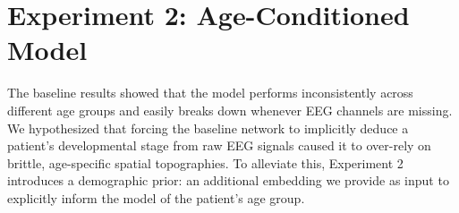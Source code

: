 \begin{table}[ht]
\centering
\caption{\textbf{Performance Breakdown by Age Cohort.} This table details the accuracy, and Cohen's Kappa scores across four distinct age groups for each channel setup. It illustrates the severe impact of simulated missing data on younger cohorts and the unexpectedly improved generalization for teenagers when we train the model on fewer channels.}
\label{tab:age_group_results}
\end{table}

\FloatBarrier
\section{Experiment 2: Age-Conditioned Model}
\label{sec:exp2_data}
The baseline results showed that the model performs inconsistently across different age groups and easily breaks down whenever EEG channels are missing. We hypothesized that forcing the baseline network to implicitly deduce a patient’s developmental stage from raw EEG signals caused it to over-rely on brittle, age-specific spatial topographies. To alleviate this, Experiment 2 introduces a demographic prior: an additional embedding we provide as input to explicitly inform the model of the patient's age group.

